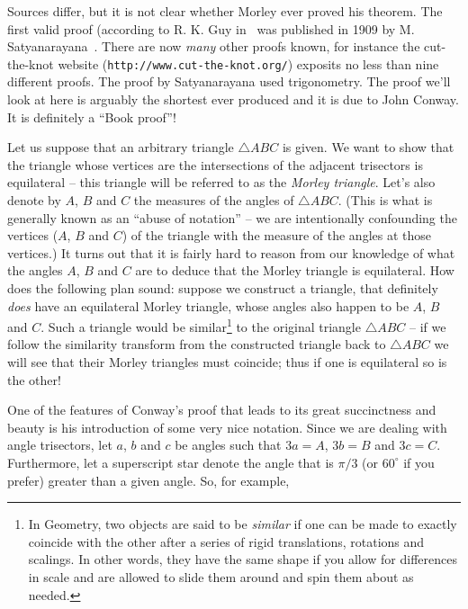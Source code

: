  
Sources differ, but it is not clear whether Morley ever proved his 
theorem.  The first valid proof (according to R. K. Guy in~\cite{lighthouse}
was published in 1909 by M. Satyanarayana~\cite{satyana}.  There are now
\emph{many} other proofs known, for instance the cut-the-knot website
(\verb+http://www.cut-the-knot.org/+) exposits no less than nine different
proofs.  The proof by Satyanarayana used trigonometry.  The proof we'll
look at here is arguably the shortest ever produced and it is due to
John Conway.  It is definitely a ``Book proof''!

Let us suppose that an arbitrary triangle ${\triangle}ABC$ is given.
We want to show that the triangle whose vertices are the intersections
of the adjacent trisectors is equilateral -- this triangle will be
referred to as the \emph{Morley triangle}.  
Let's also denote by
$A$, $B$ and $C$ the measures of the angles of ${\triangle}ABC$.  (This
is what is generally known as an ``abuse of notation'' -- we are intentionally
confounding the vertices ($A$, $B$ and $C$) of the triangle with the
measure of the angles at those vertices.)   It turns out that it is
fairly hard to reason from our knowledge of what the angles $A$, $B$ and $C$
are to deduce that the Morley triangle is equilateral.  How does the
following plan sound: suppose we construct a triangle, that definitely
\emph{does} have an equilateral Morley triangle, whose angles also happen
to be $A$, $B$ and $C$.  Such a triangle would be 
similar\footnote{In Geometry, two objects are said to be \emph{similar} %
if one can be made to exactly coincide with the other after a series of %
rigid translations, rotations and scalings.  In other words, they have %
the same shape if you allow for differences in scale and are allowed to %
slide them around and spin them about as needed.} 
to the original
triangle ${\triangle}ABC$ -- if we follow the 
similarity transform from the
constructed triangle back to ${\triangle}ABC$ we will see that their 
Morley triangles must coincide; thus if one is equilateral so is the other!

One of the features of Conway's proof that leads to its great succinctness
and beauty is his introduction of some very nice notation.  
Since we are dealing with angle trisectors, let $a$, $b$ and $c$ be 
angles such that $3a=A$, $3b=B$ and $3c=C$.  Furthermore, let a superscript
star denote the angle that is $\pi/3$ (or $60^\circ$ if you prefer) greater
than a given angle.  So, for example, 

